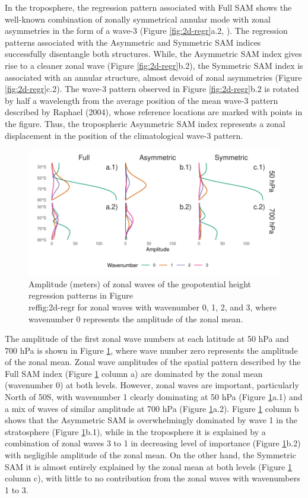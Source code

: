 \documentclass[smallextended]{svjour3}       %
\begin{document}
In the troposphere, the regression pattern associated with Full SAM shows the well-known combination of zonally symmetrical annular mode with zonal asymmetries in the form of a wave-3 (Figure \ref{fig:2d-regr}a.2, \citep{fogt2012}). The regression patterns associated with the Asymmetric and Symmetric SAM indices successfully disentangle both structures. While, the Asymmetric SAM index gives rise to a cleaner zonal wave (Figure \ref{fig:2d-regr}b.2), the Symmetric SAM index is associated with an annular structure, almost devoid of zonal asymmetries (Figure \ref{fig:2d-regr}c.2). The wave-3 pattern observed in Figure \ref{fig:2d-regr}b.2 is rotated by half a wavelength from the average position of the mean wave-3 pattern described by Raphael (2004), whose reference locations are marked with points in the figure. Thus, the tropospheric Asymmetric SAM index represents a zonal displacement in the position of the climatological wave-3 pattern.

\begin{figure}
\includegraphics{wave-amplitude-1} \caption{Amplitude (meters) of zonal waves of the geopotential height regression patterns in Figure \\ref{fig:2d-regr} for zonal waves with wavenumber 0, 1, 2, and 3, where wavenumber 0 represents the amplitude of the zonal mean.}\label{fig:wave-amplitude}
\end{figure}

The amplitude of the first zonal wave numbers at each latitude at 50 hPa and 700 hPa is shown in Figure \ref{fig:wave-amplitude}, where wave number zero represents the amplitude of the zonal mean. Zonal wave amplitudes of the spatial pattern described by the Full SAM index (Figure \ref{fig:wave-amplitude} column a) are dominated by the zonal mean (wavenumber 0) at both levels. However, zonal waves are important, particularly North of 50\degree S, with wavenumber 1 clearly dominating at 50 hPa (Figure \ref{fig:wave-amplitude}a.1) and a mix of waves of similar amplitude at 700 hPa (Figure \ref{fig:wave-amplitude}a.2). Figure \ref{fig:wave-amplitude} column b shows that the Asymmetric SAM is overwhelmingly dominated by wave 1 in the stratosphere (Figure \ref{fig:wave-amplitude}b.1), while in the troposphere it is explained by a combination of zonal waves 3 to 1 in decreasing level of importance (Figure \ref{fig:wave-amplitude}b.2) with negligible amplitude of the zonal mean. On the other hand, the Symmetric SAM it is almost entirely explained by the zonal mean at both levels (Figure \ref{fig:wave-amplitude} column c), with little to no contribution from the zonal waves with wavenumbers 1 to 3.
\end{document}
